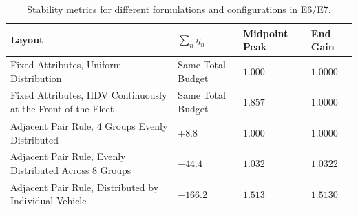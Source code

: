 \documentclass[11pt,a4paper,openany]{book}
\numberwithin{equation}{chapter}
\numberwithin{figure}{chapter}
\numberwithin{table}{chapter}
\begin{document}
\begin{table}[htbp]
\centering
\small
\caption{Stability metrics for different formulations and configurations in E6/E7.}
\label{tab:e6e7-layouts}
\begin{tabular}{p{3.5cm}p{2.7cm}p{3.2cm}p{3.2cm}}
\toprule
\textbf{Layout} & \textbf{$\sum_n\eta_n$} & \textbf{Midpoint Peak} & \textbf{End Gain} \\
\midrule







Fixed Attributes, Uniform Distribution




&




 Same Total Budget




& $1.000$ & $1.0000$ \\







Fixed Attributes, HDV Continuously at the Front of the Fleet




&




 Same Total Budget




& $1.857$ & $1.0000$ \\







Adjacent Pair Rule, 4 Groups Evenly Distributed




& $+8.8$ & $1.000$ & $1.0000$ \\







Adjacent Pair Rule, Evenly Distributed Across 8 Groups




& $-44.4$ & $1.032$ & $1.0322$ \\







Adjacent Pair Rule, Distributed by Individual Vehicle




& $-166.2$ & $1.513$ & $1.5130$ \\
\bottomrule
\end{tabular}
\end{table}
\end{document}
